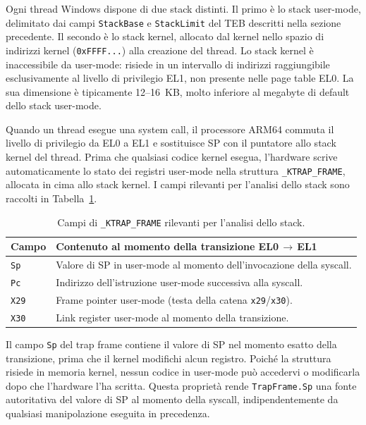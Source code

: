 Ogni thread Windows dispone di due stack distinti. Il primo è lo stack
user-mode, delimitato dai campi \texttt{StackBase} e \texttt{StackLimit} del
TEB descritti nella sezione precedente. Il secondo è lo stack kernel, allocato
dal kernel nello spazio di indirizzi kernel (\texttt{0xFFFF...}) alla creazione
del thread. Lo stack kernel è inaccessibile da user-mode: risiede in un
intervallo di indirizzi raggiungibile esclusivamente al livello di privilegio
EL1, non presente nelle page table EL0. La sua dimensione è tipicamente 12--16~KB,
molto inferiore al megabyte di default dello stack user-mode.

Quando un thread esegue una system call, il processore ARM64 commuta il livello
di privilegio da EL0 a EL1 e sostituisce SP con il puntatore allo stack kernel
del thread. Prima che qualsiasi codice kernel esegua, l'hardware scrive
automaticamente lo stato dei registri user-mode nella struttura
\texttt{\_KTRAP\_FRAME}, allocata in cima allo stack kernel. I campi rilevanti
per l'analisi dello stack sono raccolti in Tabella~\ref{tab:ktrap-frame}.

\begin{table}[H]
\centering
\begin{tabular}{lp{9cm}}
\toprule
Campo & Contenuto al momento della transizione EL0\,$\to$\,EL1 \\
\midrule
\texttt{Sp}  & Valore di SP in user-mode al momento dell'invocazione della syscall. \\
\texttt{Pc}  & Indirizzo dell'istruzione user-mode successiva alla syscall. \\
\texttt{X29} & Frame pointer user-mode (testa della catena \texttt{x29}/\texttt{x30}). \\
\texttt{X30} & Link register user-mode al momento della transizione. \\
\bottomrule
\end{tabular}
\caption{Campi di \texttt{\_KTRAP\_FRAME} rilevanti per l'analisi dello stack.}
\label{tab:ktrap-frame}
\end{table}

Il campo \texttt{Sp} del trap frame contiene il valore di SP nel momento esatto
della transizione, prima che il kernel modifichi alcun registro. Poiché la
struttura risiede in memoria kernel, nessun codice in user-mode può accedervi
o modificarla dopo che l'hardware l'ha scritta. Questa proprietà rende
\texttt{TrapFrame.Sp} una fonte autoritativa del valore di SP al momento della
syscall, indipendentemente da qualsiasi manipolazione eseguita in precedenza.


